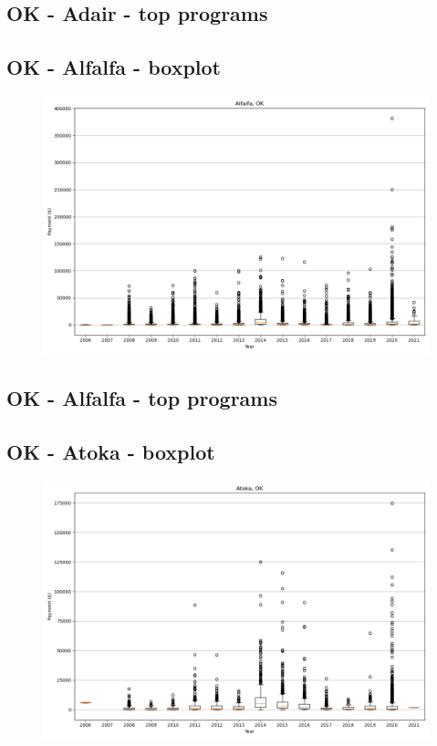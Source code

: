 \subsection*{OK - Adair - top programs}

\newpage
\subsection*{OK - Alfalfa - boxplot}
\begin{figure}[h]
\centering
\includegraphics[width=7in]{../output/boxplots/counties/Alfalfa-OK_boxplot.png}
\end{figure}


\subsection*{OK - Alfalfa - top programs}

\newpage
\subsection*{OK - Atoka - boxplot}
\begin{figure}[h]
\centering
\includegraphics[width=7in]{../output/boxplots/counties/Atoka-OK_boxplot.png}
\end{figure}


